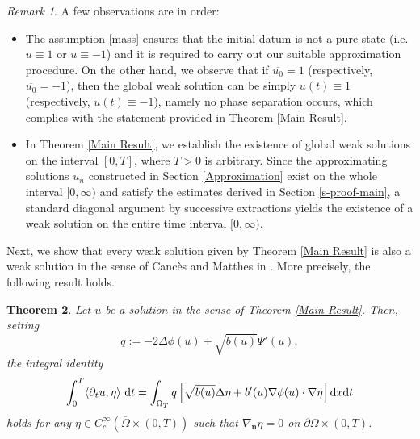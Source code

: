 \documentclass[11pt,  reqno]{amsart}%
\theoremstyle{plain}
\newtheorem{theorem}{Theorem}[section]
\theoremstyle{definition}
\theoremstyle{remark}
\newtheorem{remark}[theorem]{Remark}
\numberwithin{equation}{section}
\newcommand{\dx}{\textup{d}x}
\newcommand{\dt}{\textup{d}t}
\begin{document}
\begin{remark}
A few observations are in order: 

\begin{itemize}
\item The assumption \eqref{mass} ensures that the initial datum is not a pure state (i.e. $u\equiv 1$ or $u \equiv -1$) and it is required to carry out our suitable approximation procedure. On the other hand, we observe that if $\overline{u_0}=1$ (respectively, $\overline{u_0}=-1$), then the global weak solution can be simply $u(t)\equiv1$ (respectively, $u(t)\equiv-1$), namely no phase separation occurs, which complies with the statement provided in Theorem \ref{Main Result}.

\item In Theorem \ref{Main Result}, we establish the existence of global weak solutions on the interval $[0,T]$, where $T>0$ is arbitrary. Since the approximating solutions $u_n$ constructed in Section \ref{Approximation} exist on the whole interval $[0,\infty)$ and satisfy the estimates derived in Section \ref{s-proof-main}, a standard diagonal argument by successive extractions yields the existence of a weak solution on the entire time interval $[0,\infty)$.
\end{itemize}
\end{remark}

Next, we show that every weak solution given by Theorem \ref{Main Result} is also a weak solution in the sense of Canc{\`e}s and Matthes in \cite{CM2023}. More precisely, the following result holds.

\begin{theorem}
\label{formulazione alla Cances}
Let $u$ be a solution in the sense of Theorem \ref{Main Result}. Then, setting
\begin{equation}
    \label{q}
    q:= -2\Delta \phi(u) + \sqrt{b(u)}\Psi'(u),
\end{equation}
the integral identity
    \begin{equation}
        \label{weak formulation Cances}
        \int_0^T \langle \partial_t u, \eta \rangle \  \dt = 
         \int_{\Omega_T} q\left[\sqrt{b(u)} \Delta \eta + b'(u)\nabla \phi(u) \cdot \nabla \eta \right]\dx \dt
    \end{equation}
    holds for any $\eta \in C_c^\infty\left( \overline{\Omega} \times (0,T)\right)$ such that $\nabla_\mathbf{n} \eta=0$ on $\partial \Omega \times (0,T)$. 
\end{theorem}
\end{document}
